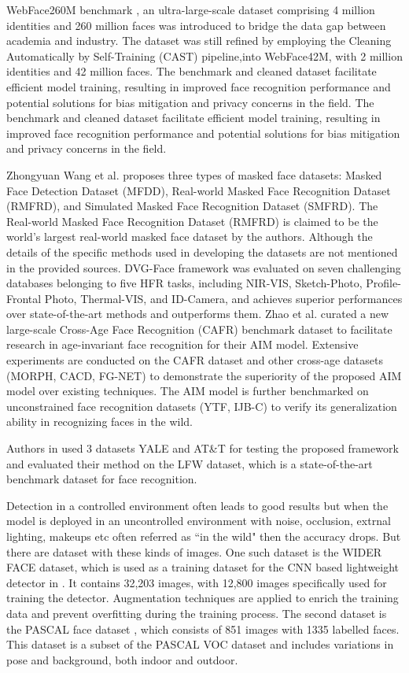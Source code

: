 WebFace260M benchmark \cite{zhu_webface260m_2023}, an ultra-large-scale dataset comprising 4 million identities and 260 million faces was introduced to bridge the data gap between academia and industry. The dataset was still refined by employing the Cleaning Automatically by Self-Training (CAST) pipeline,into WebFace42M, with 2 million identities and 42 million faces. The benchmark and cleaned dataset facilitate efficient model training, resulting in improved face recognition performance and potential solutions for bias mitigation and privacy concerns in the field. The benchmark and cleaned dataset facilitate efficient model training, resulting in improved face recognition performance and potential solutions for bias mitigation and privacy concerns in the field.

Zhongyuan Wang et al. \cite{wang_masked_2023} proposes three types of masked face datasets: Masked Face Detection Dataset (MFDD), Real-world Masked Face Recognition Dataset (RMFRD), and Simulated Masked Face Recognition Dataset (SMFRD). The Real-world Masked Face Recognition Dataset (RMFRD) is claimed to be the world's largest real-world masked face dataset by the authors. Although the details of the specific methods used in developing the datasets are not mentioned in the provided sources. DVG-Face framework \cite{fu_dvg-face_2022} was evaluated on seven challenging databases belonging to five HFR tasks, including NIR-VIS, Sketch-Photo, Profile-Frontal Photo, Thermal-VIS, and ID-Camera, and achieves superior performances over state-of-the-art methods and outperforms them. Zhao et al. \cite{zhao_towards_2022} curated a new large-scale Cross-Age Face Recognition (CAFR) benchmark dataset to facilitate research in age-invariant face recognition for their AIM model. Extensive experiments are conducted on the CAFR dataset and other cross-age datasets (MORPH, CACD, FG-NET) to demonstrate the superiority of the proposed AIM model over existing techniques. The AIM model is further benchmarked on unconstrained face recognition datasets (YTF, IJB-C) to verify its generalization ability in recognizing faces in the wild.

Authors in \cite{abuzneid_enhanced_2018} used 3 datasets YALE and AT\&T for testing the proposed framework and evaluated their method on the LFW dataset, which is a state-of-the-art benchmark dataset for face recognition.

Detection in a controlled environment often leads to good results but when the model is deployed in an uncontrolled environment with noise, occlusion, extrnal lighting, makeups etc often referred as ``in the wild" then the accuracy drops. But there are dataset with these kinds of images. One such dataset is the WIDER FACE dataset, which is used as a training dataset for the CNN based lightweight detector in \cite{putro_high_2021}. It contains 32,203 images, with 12,800 images specifically used for training the detector. Augmentation techniques are applied to enrich the training data and prevent overfitting during the training process. The second dataset is the PASCAL face dataset \cite{putro_high_2021}, which consists of 851 images with 1335 labelled faces. This dataset is a subset of the PASCAL VOC dataset and includes variations in pose and background, both indoor and outdoor.

